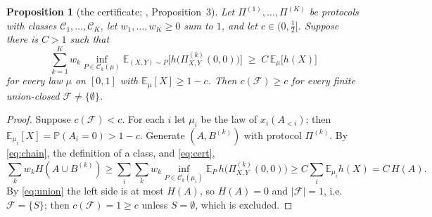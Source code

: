 \documentclass[11pt,a4paper]{article}
\newtheorem{proposition}[theorem]{Proposition}
\theoremstyle{definition}
\theoremstyle{remark}
\newcommand{\E}{\mathbb{E}}
\newcommand{\Prob}{\mathbb{P}}
\newcommand{\F}{\mathcal{F}}
\newcommand{\cC}{\mathcal{C}}
\newcommand{\ent}{h}
\begin{document}
\begin{proposition}[the certificate; \cite{Liu}, Proposition~3]\label{prop:cert}
Let $\Pi^{(1)},\dots,\Pi^{(K)}$ be protocols with classes $\cC_1,\dots,\cC_K$, let $w_1,\dots,w_K\ge0$ sum to $1$, and let $c\in(0,\tfrac12]$. Suppose there is $C>1$ such that
\begin{equation}\label{eq:cert}
\sum_{k=1}^Kw_k\inf_{P\in\cC_k(\mu)}\E_{(X,Y)\sim P}\Big[\ent\big(\Pi^{(k)}_{X,Y}(0,0)\big)\Big]\;\ge\;C\,\E_\mu\big[\ent(X)\big]
\end{equation}
for every law $\mu$ on $[0,1]$ with $\E_\mu[X]\ge1-c$. Then $c(\F)\ge c$ for every finite union-closed $\F\ne\{\emptyset\}$.
\end{proposition}
\begin{proof}
Suppose $c(\F)<c$. For each $i$ let $\mu_i$ be the law of $x_i(A_{<i})$; then $\E_{\mu_i}[X]=\Prob(A_i=0)>1-c$. Generate $(A,B^{(k)})$ with protocol $\Pi^{(k)}$. By \eqref{eq:chain}, the definition of a class, and \eqref{eq:cert},
\[\sum_kw_kH(A\cup B^{(k)})\ge\sum_i\sum_kw_k\inf_{P\in\cC_k(\mu_i)}\E_P\,\ent\big(\Pi^{(k)}_{X,Y}(0,0)\big)\ge C\sum_i\E_{\mu_i}\ent(X)=C\,H(A).\]
By \eqref{eq:union} the left side is at most $H(A)$, so $H(A)=0$ and $|\F|=1$, i.e.\ $\F=\{S\}$; then $c(\F)=1\ge c$ unless $S=\emptyset$, which is excluded.
\end{proof}
\end{document}
